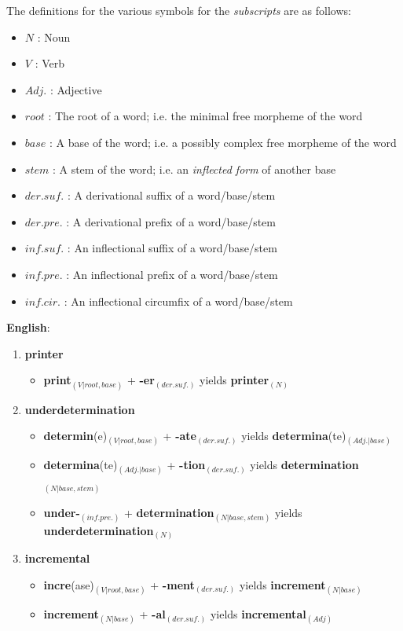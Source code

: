 \documentclass[11pt]{article}
\begin{document}
\newpage

\begin{solution}
The definitions for the various symbols for the \textit{subscripts} are as follows:
\begin{itemize}
	\item $N$ : Noun
	\item $V$ : Verb
	\item $Adj.$ : Adjective
	\item $root$ : The root of a word; i.e. the minimal free morpheme of the word
	\item $base$ : A base of the word; i.e. a possibly complex free morpheme of the word
	\item $stem$ : A stem of the word; i.e. an \textit{inflected form} of another base
	\item $der. suf.$ : A derivational suffix of a word/base/stem
	\item $der. pre.$ : A derivational prefix of a word/base/stem
	\item $inf. suf.$ : An inflectional suffix of a word/base/stem
	\item $inf. pre.$ : An inflectional prefix of a word/base/stem
	\item $inf. cir.$ : An inflectional circumfix of a word/base/stem
\end{itemize}

\textbf{English}:
\begin{enumerate}
	\item \textbf{printer}
		\begin{itemize}
			\item \textbf{print}$_{(V|root, base)}$ + \textbf{-er}$_{(der. suf.)}$ yields \textbf{printer}$_{(N)}$
		\end{itemize}
	\item \textbf{underdetermination}
		\begin{itemize}
			\item \textbf{determin}(e)$_{(V|root, base)}$ + \textbf{-ate}$_{(der. suf.)}$ yields \textbf{determina}(te)$_{(Adj.|base)}$
			\item \textbf{determina}(te)$_{(Adj.| base)}$ + \textbf{-tion}$_{(der. suf.)}$ yields \textbf{determination}$_{(N|base,stem)}$
			\item \textbf{under-}$_{(inf. pre.)}$ + \textbf{determination}$_{(N| base,stem)}$  yields \textbf{underdetermination}$_{(N)}$
		\end{itemize}
	\item \textbf{incremental}
		\begin{itemize}
			\item \textbf{incre}(ase)$_{(V|root, base)}$ + \textbf{-ment}$_{(der. suf.)}$ yields \textbf{increment}$_{(N|base)}$
			\item \textbf{increment}$_{(N|base)}$ + \textbf{-al}$_{(der. suf.)}$ yields \textbf{incremental}$_{(Adj)}$
		\end{itemize}
\end{enumerate}


\end{solution}
\end{document}
